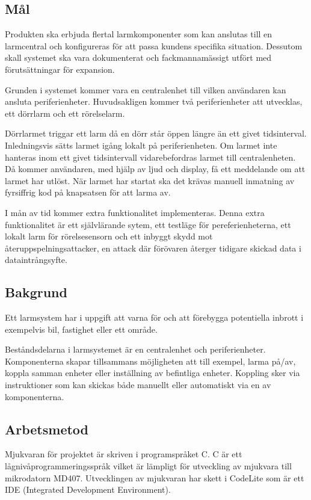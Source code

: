 \documentclass[a4paper]{article}
\begin{document}
\subsection{Mål}

Produkten ska erbjuda flertal larmkomponenter som kan anslutas till en larmcentral och konfigureras för att passa kundens specifika situation.
Dessutom skall systemet ska vara dokumenterat och fackmannamässigt utfört med förutsättningar för expansion.

Grunden i systemet kommer vara en centralenhet till vilken användaren kan ansluta periferienheter.
Huvudsakligen kommer två periferienheter att utvecklas, ett dörrlarm och ett rörelselarm.

Dörrlarmet triggar ett larm då en dörr står öppen längre än ett givet tidsinterval.
Inledningsvis sätts larmet igång lokalt på periferienheten.
Om larmet inte hanteras inom ett givet tidsintervall vidarebefordras larmet till centralenheten.
Då kommer användaren, med hjälp av ljud och display, få ett meddelande om att larmet har utlöst.
När larmet har startat ska det krävas manuell inmatning av fyrsiffrig kod på knapsatsen för att larma av.

I mån av tid kommer extra funktionalitet implementeras. Denna extra funktionalitet är ett självlärande sytem, ett testläge för pereferienheterna, ett lokalt larm för rörelsesensorn och ett inbyggt skydd mot återuppspelningsattacker, en attack där förövaren återger tidigare skickad data i dataintrångsyfte.

\subsection{Bakgrund}
Ett larmsystem har i uppgift att varna för och att förebygga potentiella inbrott i exempelvis bil, fastighet eller ett område.

Beståndsdelarna i larmsystemet är en centralenhet och periferienheter.
Komponenterna skapar tillsammans möjligheten att till exempel, larma på/av, koppla samman enheter eller inställning av befintliga enheter.
Koppling sker via instruktioner som kan skickas både manuellt eller automatiskt via en av komponenterna.

\subsection{Arbetsmetod}

Mjukvaran för projektet är skriven i programspråket C.
C är ett lågnivåprogrammeringsspråk vilket är lämpligt för utveckling av mjukvara till mikrodatorn MD407.
Utvecklingen av mjukvaran har skett i CodeLite som är ett IDE (Integrated Development Environment).
\end{document}
